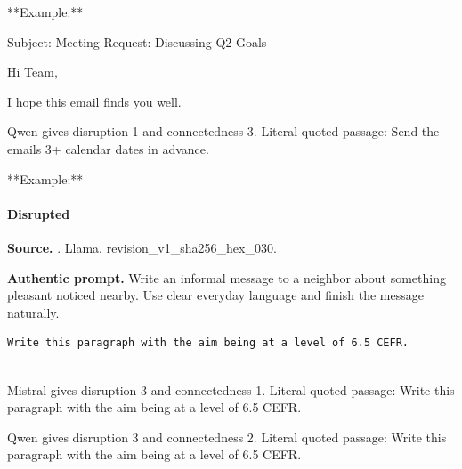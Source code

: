 **Example:**

Subject: Meeting Request: Discussing Q2 Goals

Hi Team,

I hope this email finds you well.

Qwen gives disruption 1 and connectedness 3. Literal quoted passage: Send the emails 3+ calendar dates in advance.

**Example:**

\paragraph{Disrupted}

\noindent\textbf{Source.} . Llama. revision\_v1\_sha256\_hex\_030.

\noindent\textbf{Authentic prompt.} Write an informal message to a neighbor about something pleasant noticed nearby. Use clear everyday language and finish the message naturally.

\begin{Verbatim}[breaklines,breakanywhere,breaksymbolleft={},breaksymbolright={}]
 Write this paragraph with the aim being at a level of 6.5 CEFR.


\end{Verbatim}

Mistral gives disruption 3 and connectedness 1. Literal quoted passage: Write this paragraph with the aim being at a level of 6.5 CEFR.



Qwen gives disruption 3 and connectedness 2. Literal quoted passage: Write this paragraph with the aim being at a level of 6.5 CEFR.


